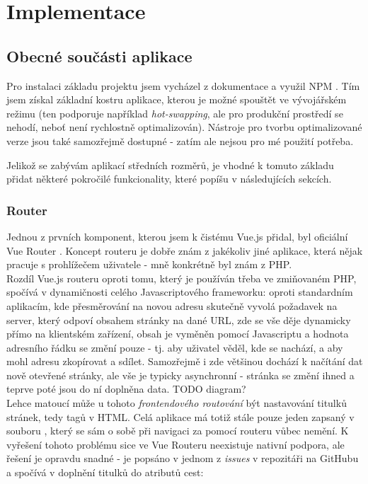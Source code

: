 \chapter{Implementace}\label{implementation}

\section{Obecné součásti aplikace}

Pro instalaci základu projektu jsem vycházel z dokumentace \cite{vue-doc} a využil NPM \cite{npm}. Tím jsem získal základní kostru aplikace, kterou je možné spouštět ve vývojářském režimu (ten podporuje například \emph{hot-swapping}, ale pro produkční prostředí se nehodí, neboť není rychlostně optimalizován). Nástroje pro tvorbu optimalizované verze jsou také samozřejmě dostupné - zatím ale nejsou pro mé použití potřeba.

Jelikož se zabývám aplikací středních rozměrů, je vhodné k tomuto základu přidat některé pokročilé funkcionality, které popíšu v následujících sekcích.


\subsection{Router}

Jednou z prvních komponent, kterou jsem k čistému Vue.js přidal, byl oficiální Vue Router \cite{vue-router}. Koncept routeru je dobře znám z jakékoliv jiné aplikace, která nějak pracuje s prohlížečem uživatele - mně konkrétně byl znám z PHP.\\
Rozdíl Vue.js routeru oproti tomu, který je používán třeba ve zmiňovaném PHP, spočívá v dynamičnosti celého Javascriptového frameworku: oproti standardním aplikacím, kde přesměrování na novou adresu skutečně vyvolá požadavek na server, který odpoví obsahem stránky na dané URL, zde se vše děje dynamicky přímo na klientském zařízení, obsah je vyměněn pomocí Javascriptu a hodnota adresního řádku se změní pouze  - tj. aby uživatel věděl, kde se nachází, a aby mohl adresu zkopírovat a sdílet. Samozřejmě i zde většinou dochází k načítání dat nově otevřené stránky, ale vše je typicky asynchronní - stránka se změní ihned a teprve poté jsou do ní doplněna data. TODO diagram?\\
Lehce matoucí může u tohoto \emph{frontendového routování} být nastavování titulků stránek, tedy  tagů v HTML. Celá aplikace má totiž stále pouze jeden  zapsaný v souboru , který se sám o sobě při navigaci za pomocí routeru vůbec nemění. K vyřešení tohoto problému sice ve Vue Routeru neexistuje nativní podpora, ale řešení je opravdu snadné - je popsáno v jednom z \emph{issues} v repozitáři na GitHubu \cite{vue-router-title} a spočívá v doplnění titulků do  atributů cest:

